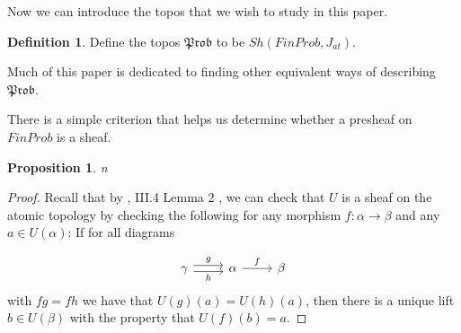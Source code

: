 \documentclass[a4paper]{amsproc}
\theoremstyle{plain}
\newtheorem{proposition}[theorem]{Proposition}
\theoremstyle{definition}
\newtheorem{definition}[theorem]{Definition}
\theoremstyle{remark}
\numberwithin{equation}{section}
\begin{document}
Now we can introduce the topos that we wish to study in this paper.

\begin{definition}
Define the topos $\mathfrak{Prob}$ to be $Sh(FinProb, J_{at})$.
\end{definition}

Much of this paper is dedicated to finding other equivalent ways of describing $\mathfrak{Prob}$.

There is a simple criterion that helps us determine whether a presheaf on $FinProb$ is a sheaf.

\begin{proposition} \label{sheaf_condition}
n
\end{proposition}
\begin{proof}
Recall that by \cite{sheaves_geometry_logic}, III.4 Lemma 2 , we can check that $U$ is a sheaf on the atomic topology by checking the following for any morphism $f: \alpha \to \beta$ and any $a \in U(\alpha)$: If for all diagrams

\[
\begin{tikzcd}
\gamma \arrow[r, "g", shift left] \arrow[r, "h"', shift right] & \alpha \arrow[r, "f"] & \beta
\end{tikzcd}
\]
with $f g = f h$ we have that $U(g)(a) = U(h)(a)$, then there is a unique lift $b \in U(\beta)$ with the property that $U(f)(b) = a$.
\end{proof}
\end{document}

